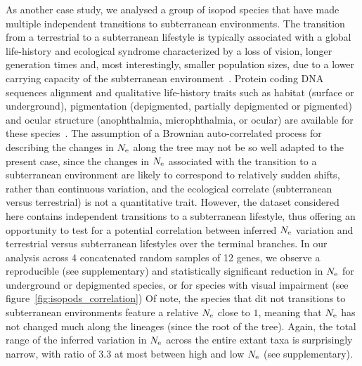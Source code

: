 \documentclass{MBE}
\begin{document}
	As another case study, we analysed a group of isopod species that have made multiple independent transitions to subterranean environments.
	The transition from a terrestrial to a subterranean lifestyle is typically associated with a global life-history and ecological syndrome characterized by a loss of vision, longer generation times and, most interestingly, smaller population sizes, due to a lower carrying capacity of the subterranean environment~\citep{Capderrey2013}.
	Protein coding {DNA} sequences alignment and qualitative life-history traits such as habitat (surface or underground), pigmentation (depigmented, partially depigmented or pigmented) and ocular structure (anophthalmia, microphthalmia, or ocular) are available for these species~\citep{Eme2013,Saclier2018}.
	The assumption of a Brownian auto-correlated process for describing the changes in $N_{\text{e}}$ along the tree may not be so well adapted to the present case, since the changes in $N_{\text{e}}$ associated with the transition to a subterranean environment are likely to correspond to relatively sudden shifts, rather than continuous variation, and the ecological correlate (subterranean versus terrestrial) is not a quantitative trait.
	However, the dataset considered here contains independent transitions to a subterranean lifestyle, thus offering an opportunity to test for a potential correlation between inferred $N_{\text{e}}$ variation and terrestrial versus subterranean lifestyles over the terminal branches.
	In our analysis across 4 concatenated random samples of 12 genes, we observe a reproducible (see supplementary) and statistically significant reduction in $N_{\text{e}}$ for underground or depigmented species, or for species with visual impairment (see figure~\ref{fig:isopods_correlation})
	Of note, the species that dit not transitions to subterranean environments feature a relative $N_{\text{e}}$ close to $1$, meaning that $N_{\text{e}}$ has not changed much along the lineages (since the root of the tree).
	Again, the total range of the inferred variation in $N_{\text{e}}$ across the entire extant taxa is surprisingly narrow, with ratio of $3.3$ at most between high and low $N_{\text{e}}$ (see supplementary).

\end{document}
